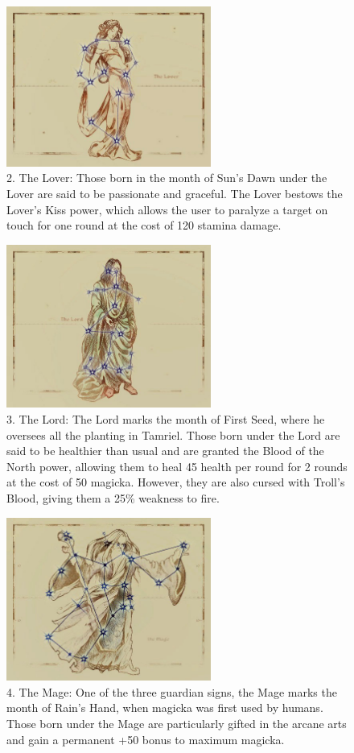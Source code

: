 \documentclass[12pt]{article}
\begin{document}
\begin{figure}[H]
\includegraphics[width=0.6\textwidth]{Lover.png}
\centering
\caption*{2. The Lover: Those born in the month of Sun's Dawn under the Lover are said to be passionate and graceful. The Lover bestows the Lover's Kiss power, which allows the user to paralyze a target on touch for one round at the cost of 120 stamina damage.}
\end{figure}

\begin{figure}[H]
\includegraphics[width=0.6\textwidth]{Lord.png}
\centering
\caption*{3. The Lord: The Lord marks the month of First Seed, where he oversees all the planting in Tamriel. Those born under the Lord are said to be healthier than usual and are granted the Blood of the North power, allowing them to heal 45 health per round for 2 rounds at the cost of 50 magicka. However, they are also cursed with Troll's Blood, giving them a 25\% weakness to fire.}
\end{figure}

\begin{figure}[H]
\includegraphics[width=0.6\textwidth]{Mage.png}
\centering
\caption*{4. The Mage: One of the three guardian signs, the Mage marks the month of Rain's Hand, when magicka was first used by humans. Those born under the Mage are particularly gifted in the arcane arts and gain a permanent +50 bonus to maximum magicka.}
\end{figure}
\end{document}
